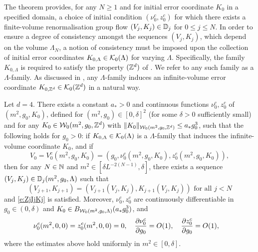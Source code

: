 The theorem provides, for any $N \ge 1$ and for initial error coordinate $K_0$
in a specified domain, a choice of initial condition $(\nu_0^c,z_0^c)$
for which there exists
a finite-volume renormalisation group flow $(V_j, K_j) \in \mathbb{D}_j$ for $0 \le j \le N$.
In order to ensure a degree of consistency amongst the sequences $(V_j, K_j)$, which depend on
the volume $\Lambda_N$, a notion of consistency must be imposed upon the collection of initial
error coordinates $K_{0,\Lambda} \in \mathcal{K}_0(\Lambda)$ for varying $\Lambda$.
Specifically, the family $K_{0,\Lambda}$ is required to satisfy the property $({ {{\mathbb Z}}^d })$ of
\cite[Definition~\ref{step-defn:KZd}]{BS-rg-step}.
We refer to any such family as a $\Lambda$-family.
As discussed in \cite[Definition~\ref{step-defn:KZd}]{BS-rg-step},
any $\Lambda$-family
induces an infinite-volume error coordinate $K_{0,{ {{\mathbb Z}}^d }} \in \mathcal{K}_0({ {{\mathbb Z}}^d })$ in a natural way.

\begin{theorem}
\label{thm:flow-flow}
Let $d = 4$.
There exists a constant $a_* > 0$ and continuous functions $\nu_0^c, z_0^c$
of $(m^2, g_0, K_0)$, defined for $(m^2, g_0) \in [0, \delta]^2$
(for some $\delta > 0$ sufficiently small) and for any $K_0 \in \mathcal{W}_0(m^2, g_0, { {{\mathbb Z}}^d })$
with $\|K_0\|_{\mathcal{W}_0(m^2, g_0, { {{\mathbb Z}}^d })} \leq a_* g_0^3$, such that
the following holds for $g_0 > 0$:
if $K_{0,\Lambda} \in \mathcal{K}_0(\Lambda)$ is a $\Lambda$-family
that induces the infinite-volume coordinate $K_0$, and if
\begin{equation}
\label{e:flow-flow-ic}
V_0 = V_0^c(m^2, g_0, K_0) = (g_0, \nu_0^c(m^2,g_0,K_0), z_0^c(m^2,g_0,K_0)),
\end{equation}
then for any $N \in {\mathbb N}$ and $m^2 \in [\delta L^{-2 (N - 1)}, \delta]$,
there exists a sequence $(V_j, K_j) \in \mathbb{D}_j(m^2, g_0, \Lambda)$
such that
\begin{equation}
  \label{e:VjKjDj}
  (V_{j+1},K_{j+1}) = (V_{j+1}(V_j, K_j), K_{j+1}(V_j, K_j)) \text{ for all } j < N
\end{equation}
and \eqref{e:ZjIjKj} is satisfied.
Moreover, $\nu_0^c,z_0^c$ are continuously differentiable in
$g_0 \in (0, \delta)$ and $K_0 \in B_{\mathcal{W}_0(m^2, g_0, \Lambda)}(a_* g_0^3)$, and
\begin{align}
&\nu_0^c(m^2,0,0) = z_0^c(m^2,0,0) = 0,
\quad
\frac{\partial \nu_0^c}{\partial g_0} = O(1),
\quad
\label{e:z0est}
\frac{\partial z_0^c}{\partial g_0} = O(1),
\end{align}
where the estimates above hold uniformly in $m^2 \in [0, \delta]$.
\end{theorem}

